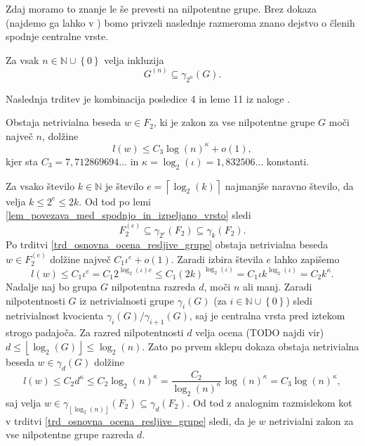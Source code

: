 \documentclass[mat1, tisk]{fmfdelo}
\numberwithin{equation}{section}  %
\begin{document}
Zdaj moramo to znanje le še prevesti na nilpotentne grupe. Brez dokaza (najdemo ga lahko v \cite[str.~17--18]{Schneider}) bomo privzeli naslednje razmeroma znano dejstvo o členih
spodnje centralne vrste. 

\begin{lema}
\label{lem_povezava_med_spodnjo_in_izpeljano_vrsto}
Za vsak $n \in \mathbb{N} \cup \left\{ 0\right\} $ velja inkluzija
\begin{equation*}
G^{(n)} \subseteq \gamma_{2^{n}}(G).
\end{equation*}    
\end{lema}

Naslednja trditev je kombinacija posledice 4 in leme 11 iz naloge \cite{Schneider_2016}.

\begin{trditev}
\label{trd_koncna_ugotovitev_nilpotentne_v_nalogi}
 Obstaja netrivialna beseda $w \in F_2$, ki je zakon za vse nilpotentne grupe $G$ moči največ $n$, dolžine \begin{equation*}
 l(w) \le  C_3 \log(n)^{\kappa} + o(1),
 \end{equation*}  
 kjer sta $C_3 = 7{,}712869694 \ldots$ in $\kappa = \log_2(\iota) = 1{,}832506 \ldots$ konstanti.    
\end{trditev}

\begin{dokaz}
    Za vsako število $k \in  \mathbb{N}$ je
    število $e = \left\lceil \log_2(k) \right\rceil$ najmanjše naravno število, da velja $k \le 2^{e} \le 2k$.
    Od tod po lemi \ref{lem_povezava_med_spodnjo_in_izpeljano_vrsto} sledi \begin{equation*}
    F_2^{(e)} \subseteq \gamma_{2^{e}}(F_2) \subseteq \gamma_k(F_2).
    \end{equation*}  
     Po trditvi \ref{trd_osnovna_ocena_resljive_grupe} obstaja netrivialna beseda $w \in  F_2^{(e)}$ dolžine največ $C_1 \iota^{e} + o(1)$.
    Zaradi izbira števila $e$ lahko zapišemo \begin{equation*}
    l(w) \le  C_1 \iota^{e} = C_1 2^{\log_2(\iota) e} \le C_1 (2k)^{\log_2(\iota)} = C_1 \iota k^{\log_2(\iota)} = C_2  k^\kappa.
    \end{equation*}
    Nadalje naj bo grupa $G$ nilpotentna razreda $d$, moči $n$ ali manj. Zaradi nilpotentnosti $G$ iz netrivialnosti grupe $\gamma_i(G)$ (za $i \in \mathbb{N} \cup \left\{ 0 \right\}$) sledi netrivialnost kvocienta $\gamma_i(G) / \gamma_{i + 1}(G)$, saj je centralna vrsta pred iztekom strogo padajoča.
    Za razred nilpotentnosti $d$ velja ocena (TODO najdi vir) $d \le \left\lfloor \log_2(G)  \right\rfloor \le \log_2(n)$. Zato po prvem sklepu dokaza obstaja netrivialna beseda $w \in \gamma_d(G)$ dolžine \begin{equation*}
    l(w) \le C_2 d^{\kappa} \le C_2 \log_2(n)^{\kappa} = \frac{C_2}{\log_2(n)^{\kappa}} \log(n)^{\kappa} = C_3 \log(n)^{\kappa}, 
    \end{equation*}  
     saj velja $w \in \gamma_{\left\lfloor \log_2(n) \right\rfloor}(F_2) \subseteq \gamma_{d}(F_2)$. Od tod z analognim razmislekom kot v trditvi \ref{trd_osnovna_ocena_resljive_grupe} sledi, da je $w$ netrivialni zakon za vse nilpotentne grupe razreda $d$. 
\end{dokaz}
\end{document}
